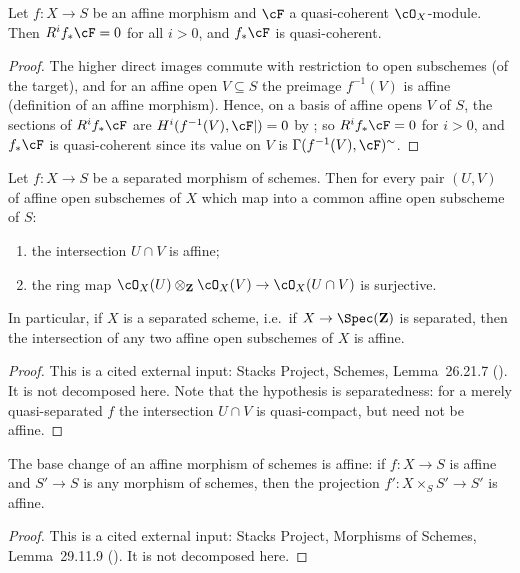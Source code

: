 \begin{lemma}
\label{lem:pc-affine-morphism-hi}
Let $f:X\to S$ be an affine morphism and $\cF$ a quasi-coherent
$\cO_X$-module.  Then $R^if_*\cF=0$ for all $i>0$, and $f_*\cF$ is
quasi-coherent.
\end{lemma}
\begin{proof}
The higher direct images commute with restriction to open subschemes
(of the target), and for an affine open $V\subseteq S$ the preimage
$f^{-1}(V)$ is affine (definition of an affine morphism).  Hence, on a
basis of affine opens $V$ of $S$, the sections of $R^if_*\cF$ are
$H^i(f^{-1}(V),\cF|)=0$ by ; so
$R^if_*\cF=0$ for $i>0$, and $f_*\cF$ is quasi-coherent since its
value on $V$ is $\Gamma(f^{-1}(V),\cF)^{\sim}$.
\end{proof}

\begin{lemma}
\label{lem:pc-affine-intersection-separated}
Let $f:X\to S$ be a separated morphism of schemes.  Then for every pair
$(U,V)$ of affine open subschemes of $X$ which map into a common affine
open subscheme of $S$:
\begin{enumerate}
\item the intersection $U\cap V$ is affine;
\item the ring map
$\cO_X(U)\otimes_{\mathbf Z}\cO_X(V)\to\cO_X(U\cap V)$ is surjective.
\end{enumerate}
In particular, if $X$ is a separated scheme, i.e.\ if
$X\to\Spec(\mathbf Z)$ is separated, then the intersection of any two
affine open subschemes of $X$ is affine.
\end{lemma}
\begin{proof}
This is a cited external input: Stacks Project, Schemes, Lemma~26.21.7
().  It is not decomposed here.  Note that the
hypothesis is separatedness: for a merely quasi-separated $f$ the
intersection $U\cap V$ is quasi-compact, but need not be affine.
\end{proof}

\begin{lemma}
\label{lem:pc-base-change-affine}
The base change of an affine morphism of schemes is affine: if
$f:X\to S$ is affine and $S'\to S$ is any morphism of schemes, then the
projection $f':X\times_SS'\to S'$ is affine.
\end{lemma}
\begin{proof}
This is a cited external input: Stacks Project, Morphisms of Schemes,
Lemma~29.11.9 ().  It is not decomposed here.
\end{proof}

